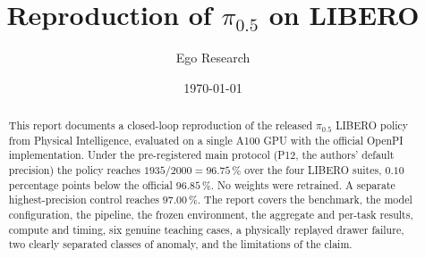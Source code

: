 \documentclass[11pt, a4paper]{article}
\title{Reproduction of $\pi_{0.5}$ on LIBERO}
\author{Ego Research}
\date{\today}
\begin{document}
\maketitle

\begin{abstract}
  This report documents a closed-loop reproduction of the released $\pi_{0.5}$
  LIBERO policy from Physical Intelligence, evaluated on a single A100 GPU with
  the official OpenPI implementation. Under the pre-registered main protocol
  (P12, the authors' default precision) the policy reaches
  $1935/2000 = 96.75\,\%$ over the four LIBERO suites, $0.10$ percentage points
  below the official $96.85\,\%$. No weights were retrained. A separate
  highest-precision control reaches $97.00\,\%$. The report covers the benchmark,
  the model configuration, the pipeline, the frozen environment, the aggregate
  and per-task results, compute and timing, six genuine teaching cases, a
  physically replayed drawer failure, two clearly separated classes of anomaly,
  and the limitations of the claim.
\end{abstract}

\tableofcontents
\newpage





\end{document}

